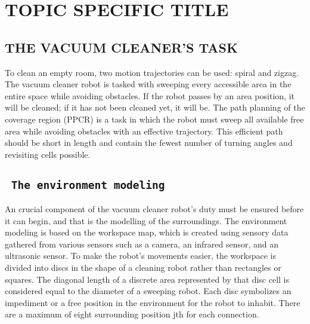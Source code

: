 \chapter{\texorpdfstring{\centering \textbf{\MakeUppercase{Topic Specific Title}}}{Topic Specific Title}}

\section{\textbf{\MakeUppercase{the vacuum cleaner’s task}}}
\justifying
To clean an empty room, two motion trajectories can be used: spiral and zigzag.
The vacuum cleaner robot is tasked with sweeping every accessible area in the entire space while avoiding obstacles. If the robot passes by an area position, it will be cleaned; if it has not been cleaned yet, it will be.
The path planning of the coverage region (PPCR) is a task in which the robot must sweep all available free area while avoiding obstacles with an effective trajectory.
This efficient path should be short in length and contain the fewest number of turning angles and revisiting cells possible.
\section{\texttt{ The environment modeling}}
\justifying
An crucial component of the vacuum cleaner robot's duty must be ensured before it can begin, and that is the modelling of the surroundings.
The environment modeling is based on the workspace map, which is created using sensory data gathered from various sensors such as a camera, an infrared sensor, and an ultrasonic sensor.
To make the robot's movements easier, the workspace is divided into discs in the shape of a cleaning robot rather than rectangles or squares. The diagonal length of a discrete area represented by that disc cell is considered equal to the diameter of a sweeping robot.
Each disc symbolizes an impediment or a free position in the environment for the robot to inhabit. There are a maximum of eight surrounding position jth for each connection.
